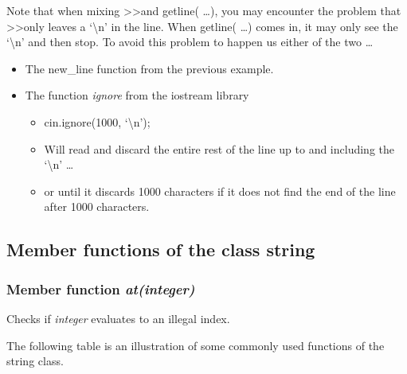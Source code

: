 Note that when mixing \textgreater\textgreater and getline( \ldots ), you may encounter the problem that
\textgreater\textgreater only leaves a `\textbackslash n' in the line. When getline( \ldots ) comes in, it may only
see the `\textbackslash n' and then stop. To avoid this problem to happen us either of the two \ldots
\begin{itemize}
	\item The new\_line function from the previous example.
	\item The function \emph{ignore} from the iostream library
	\begin{itemize}
		\item cin.ignore(1000, `\textbackslash n');  
		\item Will read and discard the entire rest of the line up to and including the `\textbackslash n' \ldots
		\item or until it discards 1000 characters if it does not find the end of the line after 1000 characters.
	\end{itemize}
\end{itemize}



\subsection{Member functions of the class string}
\subsubsection*{Member function \emph{at(integer)}}
Checks if \emph{integer} evaluates to an illegal index.

The following table is an illustration of some commonly used functions of the string class.

